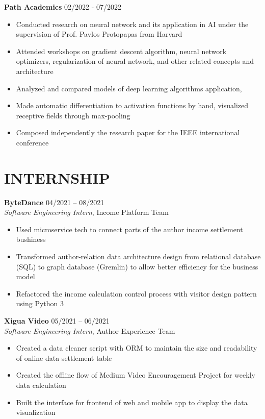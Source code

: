 \documentclass[margin,line]{res}
\begin{document}
\begin{resume}
\textbf{Path Academics} \hfill 02/2022 - 07/2022 \\
\begin{itemize}
	\item Conducted research on neural network and its application in AI under the supervision of Prof. Pavlos Protopapas from Harvard 
	\item Attended workshops on gradient descent algorithm, neural network optimizers,
		regularization of neural network, and other related concepts and architecture 
	\item Analyzed and compared models of deep learning algorithms application, 
	\item Made automatic differentiation to activation functions by hand, visualized receptive fields through max-pooling
	\item Composed independently the research paper for the IEEE international conference 
\end{itemize}

\section{\sc INTERNSHIP}
\textbf{ByteDance} \hfill {04/2021 -- 08/2021} \\
\textit{Software Engineering Intern}, {Income Platform Team}
\begin{itemize}
	\item Used microservice tech to connect parts of the author income settlement bushiness
	\item Transformed author-relation data architecture design from relational database (SQL) to graph database (Gremlin) to allow better efficiency for the business model
	\item Refactored the income calculation control process with visitor design pattern using Python 3
\end{itemize}

\textbf{Xigua Video} \hfill {05/2021 -- 06/2021} \\
\textit{Software Engineering Intern}, {Author Experience Team}
\begin{itemize}
	\item Created a data cleaner script with ORM to maintain the size and readability of online data settlement table 
	\item Created the offline flow of Medium Video Encouragement Project for weekly data calculation
	\item Built the interface for frontend of web and mobile app to display the data visualization 
\end{itemize}


\end{resume}
\end{document}
